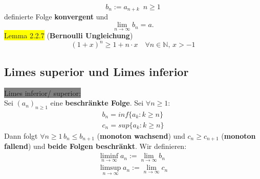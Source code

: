 \documentclass[landscape, 10pt]{article}
\newcommand{\N}{\mathbb{N}}
\begin{document}
\begin{multicols}{3}
\begin{equation*}
                            b_n:=a_{n+k}\enspace n\geqslant1
                     \end{equation*} 
                     definierte Folge \textbf{konvergent} und 
                     \begin{equation*}
                            \lim\limits_{n\to\infty}b_n=a.
                     \end{equation*}
              \colorbox{yellow}{Lemma 2.2.7} 
              (\textbf{Bernoulli Ungleichung}) 
                     \begin{equation*}
                            (1+x)^n\geqslant 1+n\cdot x \quad\forall n\in\N,\, x>-1
                     \end{equation*}
       \subsection{Limes superior und Limes inferior}
              \colorbox{gray}{Limes inferior/ superior:} \\
                     Sei \textcolor{NavyBlue}{$(a_n)_{n\geqslant 1}$}
                     eine \textbf{beschränkte Folge}. Sei 
                     \textcolor{NavyBlue}{
                     $\forall n\geqslant1$}:
                     \begin{align*}
                            b_n=inf\{a_k:k\geqslant n\}\\
                            c_n=sup\{a_k:k\geqslant n\}
                     \end{align*}
                     Dann folgt 
                     \textcolor{NavyBlue}{
                     $\forall n\geqslant1\,b_n\leqslant b_{n+1}$} 
                     (\textbf{monoton wachsend}) und 
                     \textcolor{NavyBlue}{
                     $c_n\geqslant c_{n+1}$} 
                     (\textbf{monoton fallend}) 
                     und \textbf{beide Folgen beschränkt}. 
                     Wir definieren: 
                     \begin{align*}
                            \liminf\limits_{n\to\infty}a_n
                            :=\lim\limits_{n\to\infty}b_n\\
                            \limsup\limits_{n\to\infty}a_n
                            :=\lim\limits_{n\to\infty}c_n
                     \end{align*}

\end{multicols}
\end{document}
